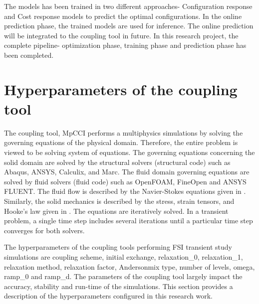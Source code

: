The models has been trained in two different approaches- Configuration response and Cost response models to predict the optimal configurations. In the online prediction phase, the trained models are used for inference.  The online prediction will be integrated to the coupling tool in future. In this research project, the complete pipeline- optimization phase, training phase and prediction phase has been completed.
    
    
\section{Hyperparameters of the coupling tool}
 \label{section:hyperparameters_couplingtool}  
The coupling tool, MpCCI performs a multiphysics simulations by solving the governing equations of the physical domain. Therefore, the entire problem is viewed to be solving system of equations. The governing equations concerning the solid domain are solved by the structural solvers (structural code) such as Abaqus, ANSYS, Calculix, and Marc. The fluid domain governing equations are solved by fluid solvers (fluid code) such as OpenFOAM, FineOpen and ANSYS FLUENT. The fluid flow is described by the Navier-Stokes equations given in \cite{FSICartesiangrid}. Similarly, the solid mechanics is described by the stress, strain tensors, and Hooke’s law given in \cite{FSICartesiangrid}. The equations are iteratively solved. In a transient problem, a single time step includes several iterations until a particular time step converges for both solvers.

The hyperparameters of the coupling tools performing FSI transient study simulations are coupling scheme, initial exchange, relaxation\_0, relaxation\_1, relaxation method, relaxation factor, Andersonmix type, number of levels, omega, ramp\_0 and ramp\_d. The parameters of the coupling tool largely impact the accuracy, stability and run-time of the simulations. This section provides a description of the hyperparameters configured in this research work.

